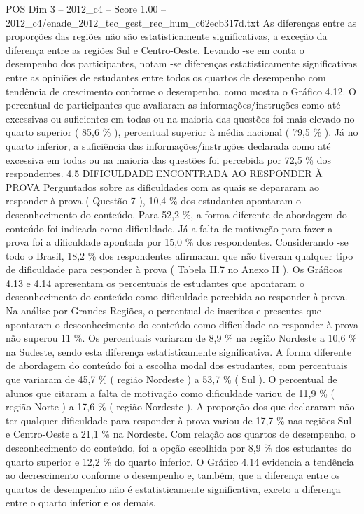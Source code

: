 \begin{textsample}{POS Dim 3 – 2012\_c4 – Score 1.00 – 2012\_c4/enade\_2012\_tec\_gest\_rec\_hum\_c62ecb317d.txt}
As diferenças entre as proporções das regiões não são estatisticamente significativas, a exceção da diferença entre as regiões Sul e Centro-Oeste.
Levando -se em conta o desempenho dos participantes, notam -se diferenças estatisticamente significativas entre as opiniões de estudantes entre todos os quartos de desempenho com tendência de crescimento conforme o desempenho, como mostra o Gráfico 4.12.
O percentual de participantes que avaliaram as informações/instruções como até excessivas ou suficientes em todas ou na maioria das questões foi mais elevado no quarto superior ( 85,6 \% ), percentual superior à média nacional ( 79,5 \% ).
Já no quarto inferior, a suficiência das informações/instruções declarada como até excessiva em todas ou na maioria das questões foi percebida por 72,5 \% dos respondentes. 4.5 DIFICULDADE ENCONTRADA AO RESPONDER À PROVA Perguntados sobre as dificuldades com as quais se depararam ao responder à prova ( Questão 7 ), 10,4 \% dos estudantes apontaram o desconhecimento do conteúdo.
Para 52,2 \%, a forma diferente de abordagem do conteúdo foi indicada como dificuldade.
Já a falta de motivação para fazer a prova foi a dificuldade apontada por 15,0 \% dos respondentes.
Considerando -se todo o Brasil, 18,2 \% dos respondentes afirmaram que não tiveram qualquer tipo de dificuldade para responder à prova ( Tabela II.7 no Anexo II ).
Os Gráficos 4.13 e 4.14 apresentam os percentuais de estudantes que apontaram o desconhecimento do conteúdo como dificuldade percebida ao responder à prova.
Na análise por Grandes Regiões, o percentual de inscritos e presentes que apontaram o desconhecimento do conteúdo como dificuldade ao responder à prova não superou 11 \%.
Os percentuais variaram de 8,9 \% na região Nordeste a 10,6 \% na Sudeste, sendo esta diferença estatisticamente significativa.
A forma diferente de abordagem do conteúdo foi a escolha modal dos estudantes, com percentuais que variaram de 45,7 \% ( região Nordeste ) a 53,7 \% ( Sul ).
O percentual de alunos que citaram a falta de motivação como dificuldade variou de 11,9 \% ( região Norte ) a 17,6 \% ( região Nordeste ).
A proporção dos que declararam não ter qualquer dificuldade para responder à prova variou de 17,7 \% nas regiões Sul e Centro-Oeste a 21,1 \% na Nordeste.
Com relação aos quartos de desempenho, o desconhecimento do conteúdo, foi a opção escolhida por 8,9 \% dos estudantes do quarto superior e 12,2 \% do quarto inferior.
O Gráfico 4.14 evidencia a tendência ao decrescimento conforme o desempenho e, também, que a diferença entre os quartos de desempenho não é estatisticamente significativa, exceto a diferença entre o quarto inferior e os demais.

\end{textsample}
